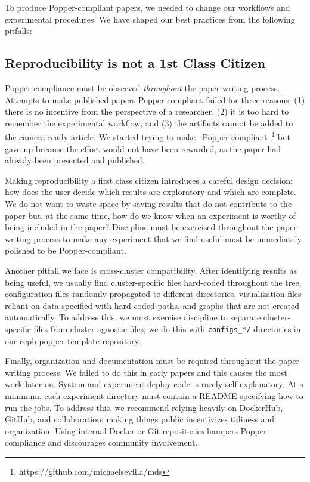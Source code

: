 To produce Popper-compliant papers, we needed to change our workflows and
experimental procedures. We have shaped our best practices from the following pitfalls:

\subsection{Reproducibility is not a 1st Class Citizen}
\label{sec:repro}

Popper-compliance must be observed {\it throughout} the paper-writing process.
Attempts to make published papers Popper-compliant failed for three reasons:
(1) there is no incentive from the perspective of a researcher, (2) it is too
hard to remember the experimental workflow, and (3) the artifacts cannot be
added to the camera-ready article. We started trying to
make~\cite{sevilla:sc15-mantle}
Popper-compliant~\footnote{https://github.com/michaelsevilla/mds} but gave up
because the effort would not have been rewarded, as the paper had already been
presented and published.

Making reproducibility a first class citizen introduces a careful design
decision: how does the user decide which results are exploratory and which are
complete. We do not want to waste space by saving results that do not
contribute to the paper but, at the same time, how do we know when an
experiment is worthy of being included in the paper? Discipline must be
exercised throughout the paper-writing process to make any experiment that we
find useful must be immediately polished to be Popper-compliant.

Another pitfall we face is cross-cluster compatibility. After identifying
results as being useful, we usually find cluster-specific files hard-coded
throughout the tree, configuration files randomly propagated to different
directories, visualization files reliant on data specified with hard-coded
paths, and graphs that are not created automatically. To address this, we must
exercise discipline to separate cluster-specific files from cluster-agnostic
files; we do this with \texttt{configs\_*/} directories in our
ceph-popper-template repository.

Finally, organization and documentation must be required throughout the
paper-writing process. We failed to do this in early papers and this causes the
most work later on. System and experiment deploy code is rarely
self-explanatory. At a minimum, each experiment directory must contain a README
specifying how to run the jobs. To address this, we recommend relying heavily
on DockerHub, GitHub, and collaboration; making things public incentivizes 
tidiness and organization. Using internal Docker or Git repositories hampers
Popper-compliance and discourages community involvement.

